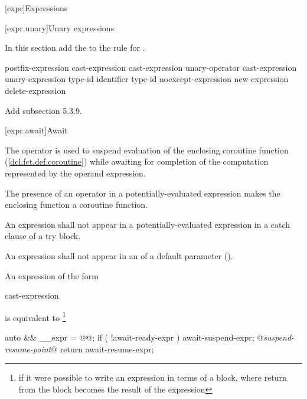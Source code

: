 

\setcounter{chapter}{4}
[expr]{Expressions}

\setcounter{section}{2}
[expr.unary]{Unary expressions}

In this section add the   
to the rule for .

\begin{bnf}
	\br
	postfix-expression\br
	\terminal{++} cast-expression\br
	\terminal{-{-}} cast-expression\br
	\br
	unary-operator cast-expression\br
	 unary-expression\br
	 type-id \terminal{)}\br
	 \terminal{(} identifier \terminal{)}\br
	 type-id \terminal{)}\br
	noexcept-expression\br
	new-expression\br
	delete-expression\br
\end{bnf}

Add subsection 5.3.9.

\setcounter{subsection}{8}
[expr.await]{Await}

\pnum
The  operator is used to suspend evaluation of the enclosing coroutine function (\ref{dcl.fct.def.coroutine}) while awaiting
for completion of the computation represented by the operand expression.

\pnum
The presence of an  operator in a potentially-evaluated expression makes the enclosing function a coroutine function.

\pnum
An  expression shall not appear in a potentially-evaluated expression in a catch clause of a try block.

\pnum
An  expression shall not appear in an  of a default parameter ().


\pnum
An  expression of the form

\begin{ncbnf}
	 cast-expression
\end{ncbnf}

is equivalent to \footnote{if it were possible to write
an expression in terms of a block, where return from the 
block becomes the result of the expression}

\begin{codeblock}
{
  auto && __expr = @@;
  if ( !await-ready-expr ) {
    await-suspend-expr;
    @\textit{suspend-resume-point}@
  }
  return await-resume-expr;
}
\end{codeblock}

